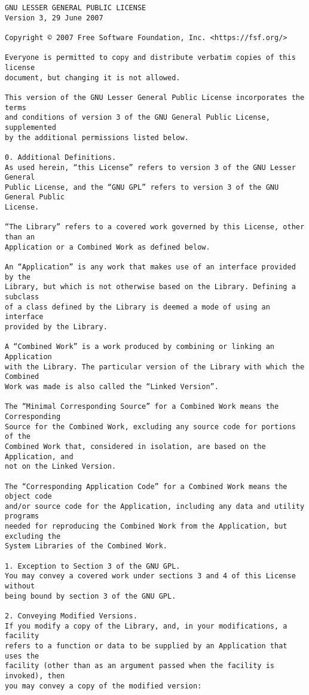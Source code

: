 \begin{verbatim}
GNU LESSER GENERAL PUBLIC LICENSE
Version 3, 29 June 2007

Copyright © 2007 Free Software Foundation, Inc. <https://fsf.org/>

Everyone is permitted to copy and distribute verbatim copies of this license
document, but changing it is not allowed.

This version of the GNU Lesser General Public License incorporates the terms
and conditions of version 3 of the GNU General Public License, supplemented
by the additional permissions listed below.

0. Additional Definitions.
As used herein, “this License” refers to version 3 of the GNU Lesser General
Public License, and the “GNU GPL” refers to version 3 of the GNU General Public
License.

“The Library” refers to a covered work governed by this License, other than an
Application or a Combined Work as defined below.

An “Application” is any work that makes use of an interface provided by the
Library, but which is not otherwise based on the Library. Defining a subclass
of a class defined by the Library is deemed a mode of using an interface
provided by the Library.

A “Combined Work” is a work produced by combining or linking an Application
with the Library. The particular version of the Library with which the Combined
Work was made is also called the “Linked Version”.

The “Minimal Corresponding Source” for a Combined Work means the Corresponding
Source for the Combined Work, excluding any source code for portions of the
Combined Work that, considered in isolation, are based on the Application, and
not on the Linked Version.

The “Corresponding Application Code” for a Combined Work means the object code
and/or source code for the Application, including any data and utility programs
needed for reproducing the Combined Work from the Application, but excluding the
System Libraries of the Combined Work.

1. Exception to Section 3 of the GNU GPL.
You may convey a covered work under sections 3 and 4 of this License without
being bound by section 3 of the GNU GPL.

2. Conveying Modified Versions.
If you modify a copy of the Library, and, in your modifications, a facility
refers to a function or data to be supplied by an Application that uses the
facility (other than as an argument passed when the facility is invoked), then
you may convey a copy of the modified version:


\end{verbatim}
